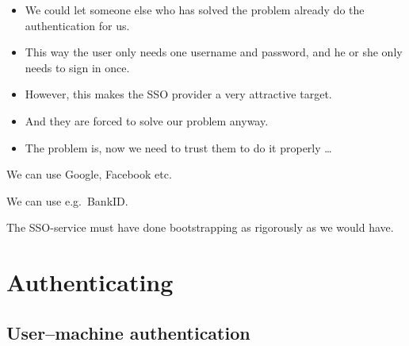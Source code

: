 \begin{frame}
  \begin{itemize}
    \item We could let someone else who has solved the problem already do the 
      authentication for us.

    \item This way the user only needs one username and password, and he or she 
      only needs to sign in once.

    \item However, this makes the SSO provider a very attractive target.

    \item And they are forced to solve our problem anyway.

    \item The problem is, now we need to trust them to do it properly \dots
  \end{itemize}
\end{frame}

\begin{frame}
  \begin{example}
    We can use Google, Facebook etc.
  \end{example}

  \begin{example}
    We can use e.g.\ BankID.
  \end{example}

  \begin{remark}
    The SSO-service must have done bootstrapping as rigorously as we would 
    have.
  \end{remark}
\end{frame}


\section{Authenticating}

\subsection{User--machine authentication}

